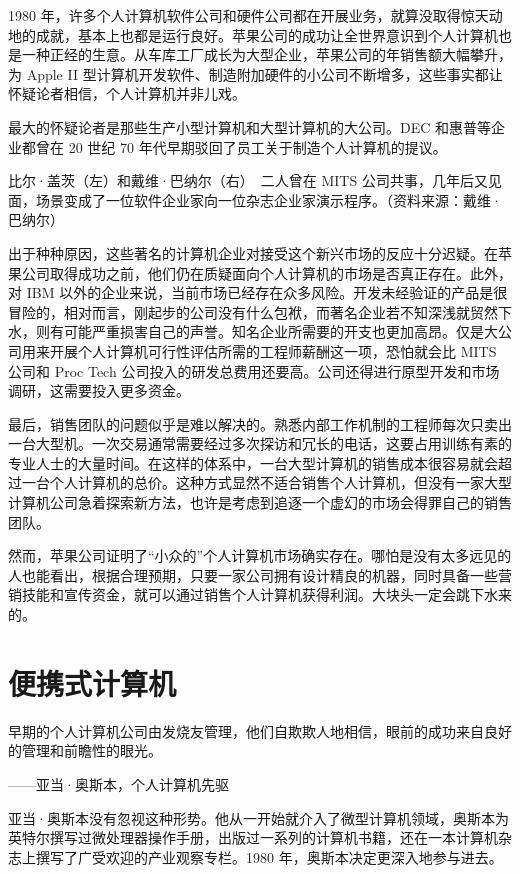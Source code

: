 \documentclass[12pt,UTF8]{ctexbook}
\begin{document}
1980 年，许多个人计算机软件公司和硬件公司都在开展业务，就算没取得惊天动地的成就，基本上也都是运行良好。苹果公司的成功让全世界意识到个人计算机也是一种正经的生意。从车库工厂成长为大型企业，苹果公司的年销售额大幅攀升，为 Apple II 型计算机开发软件、制造附加硬件的小公司不断增多，这些事实都让怀疑论者相信，个人计算机并非儿戏。

最大的怀疑论者是那些生产小型计算机和大型计算机的大公司。DEC 和惠普等企业都曾在 20 世纪 70 年代早期驳回了员工关于制造个人计算机的提议。



比尔·盖茨（左）和戴维·巴纳尔（右）　二人曾在 MITS 公司共事，几年后又见面，场景变成了一位软件企业家向一位杂志企业家演示程序。（资料来源：戴维·巴纳尔）

出于种种原因，这些著名的计算机企业对接受这个新兴市场的反应十分迟疑。在苹果公司取得成功之前，他们仍在质疑面向个人计算机的市场是否真正存在。此外，对 IBM 以外的企业来说，当前市场已经存在众多风险。开发未经验证的产品是很冒险的，相对而言，刚起步的公司没有什么包袱，而著名企业若不知深浅就贸然下水，则有可能严重损害自己的声誉。知名企业所需要的开支也更加高昂。仅是大公司用来开展个人计算机可行性评估所需的工程师薪酬这一项，恐怕就会比 MITS 公司和 Proc Tech 公司投入的研发总费用还要高。公司还得进行原型开发和市场调研，这需要投入更多资金。

最后，销售团队的问题似乎是难以解决的。熟悉内部工作机制的工程师每次只卖出一台大型机。一次交易通常需要经过多次探访和冗长的电话，这要占用训练有素的专业人士的大量时间。在这样的体系中，一台大型计算机的销售成本很容易就会超过一台个人计算机的总价。这种方式显然不适合销售个人计算机，但没有一家大型计算机公司急着探索新方法，也许是考虑到追逐一个虚幻的市场会得罪自己的销售团队。

然而，苹果公司证明了“小众的”个人计算机市场确实存在。哪怕是没有太多远见的人也能看出，根据合理预期，只要一家公司拥有设计精良的机器，同时具备一些营销技能和宣传资金，就可以通过销售个人计算机获得利润。大块头一定会跳下水来的。





\section{便携式计算机}


早期的个人计算机公司由发烧友管理，他们自欺欺人地相信，眼前的成功来自良好的管理和前瞻性的眼光。

——亚当·奥斯本，个人计算机先驱



亚当·奥斯本没有忽视这种形势。他从一开始就介入了微型计算机领域，奥斯本为英特尔撰写过微处理器操作手册，出版过一系列的计算机书籍，还在一本计算机杂志上撰写了广受欢迎的产业观察专栏。1980 年，奥斯本决定更深入地参与进去。
\end{document}

